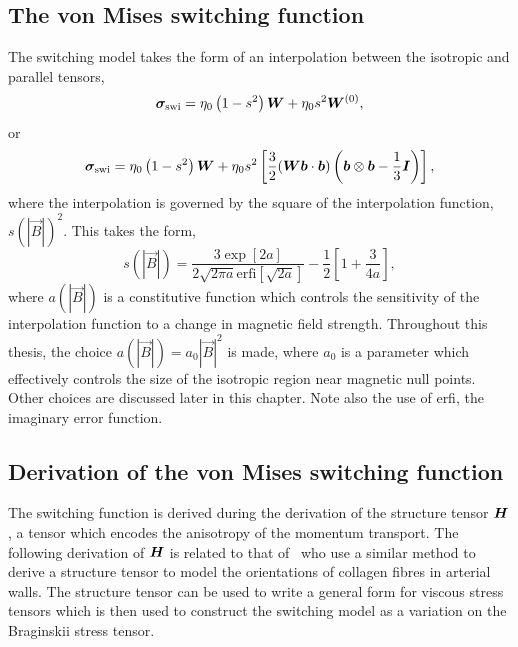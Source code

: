 \subsection{The von Mises switching function}

The switching model takes the form of an interpolation between the isotropic and parallel tensors,
\begin{equation}
  \label{eq:switching_model_simple}
{\bm \sigma}_{\text{swi}} = \eta_0 \left( 1 - s^2 \right) {\bm W} + \eta_0 s^2 {\bm W}^{(0)},
\end{equation}
or
\begin{equation}
  \label{eq:switching_model}
{\bm \sigma}_{\text{swi}} = \eta_0 \left( 1 - s^2 \right) {\bm W} + \eta_0 s^2 \left[\frac{3}{2}({\bm W}{\bm b}\cdot{\bm b}) \left( {\bm b} \otimes {\bm b} - \frac{1}{3}{\bm I} \right)\right],
\end{equation}
where the interpolation is governed by the square of the interpolation function, $s(|\vec{B}|)^2$. This takes the form,
\begin{equation}
  \label{eq:switching_function}
s(|\vec{B}|) = \frac{3 \exp[2a]}{2\sqrt{2\pi a} \text{erfi}[\sqrt{2a}]} - \frac{1}{2}\left[ 1 + \frac{3}{4a} \right],
\end{equation}
where $a(|\vec{B}|)$ is a constitutive function which controls the sensitivity of the interpolation function to a change in magnetic field strength. Throughout this thesis, the choice $a(|\vec{B}|) = a_0 |\vec{B}|^2$ is made, where $a_0$ is a parameter which effectively controls the size of the isotropic region near magnetic null points. Other choices are discussed later in this chapter. Note also the use of erfi, the imaginary error function.

\subsection{Derivation of the von Mises switching function}

The switching function is derived during the derivation of the structure tensor ${\bm H}$, a tensor which encodes the anisotropy of the momentum transport. The following derivation of ${\bm H}$ is related to that of~\cite{gasserHyperelasticModellingArterial2006} who use a similar method to derive a structure tensor to model the orientations of collagen fibres in arterial walls. The structure tensor can be used to write a general form for viscous stress tensors which is then used to construct the switching model as a variation on the Braginskii stress tensor.


